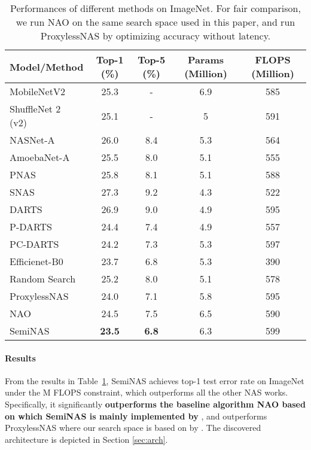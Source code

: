 \documentclass{article}
\begin{document}
\begin{table}[htbp]
\centering
\small
\begin{tabular}{lcccc}
\toprule
Model/Method                      & Top-1 (\%) & Top-5 (\%) & Params (Million) & FLOPS (Million) \\ \hline
MobileNetV2~\cite{mobilenetv2}               & 25.3      & -        & 6.9             & 585 \\
ShuffleNet 2 (v2)~\cite{shufflenet}  & 25.1      & -        &  5        & 591  \\
\midrule
NASNet-A~\cite{nas}               & 26.0      & 8.4       & 5.3       & 564 \\
AmoebaNet-A~\cite{amoebanet}      & 25.5      & 8.0       & 5.1       & 555 \\
PNAS~\cite{PNAS}                  & 25.8      & 8.1       & 5.1       & 588 \\
SNAS~\cite{snas}                  & 27.3      & 9.2       & 4.3       & 522\\
DARTS~\cite{darts}                & 26.9      & 9.0       & 4.9       & 595 \\
P-DARTS~\cite{pdarts}             & 24.4      & 7.4       & 4.9       & 557\\
PC-DARTS~\cite{pcdarts}           & 24.2      & 7.3       & 5.3       & 597\\
Efficienet-B0~\cite{efficientnet} & 23.7      & 6.8       & 5.3       & 390 \\
\midrule
Random Search                    & 25.2    & 8.0     & 5.1   & 578 \\
ProxylessNAS~\cite{proxylessnas}  & 24.0      & 7.1  & 5.8      & 595\\
NAO~\cite{nao}                  & 24.5      & 7.5       & 6.5       & 590 \\
\midrule
SemiNAS                           & \textbf{23.5}      & \textbf{6.8}       & 6.3      & 599\\
\bottomrule
\end{tabular}
\caption{Performances of different methods on ImageNet. For fair comparison, we run NAO on the same search space used in this paper, and run ProxylessNAS by optimizing accuracy without latency.}
\label{tbl:imagenet}
\end{table}
\paragraph{Results}
From the results in Table~\ref{tbl:imagenet}, SemiNAS achieves  top-1 test error rate on ImageNet under the M FLOPS constraint, which outperforms all the other NAS works. Specifically, it significantly \textbf{outperforms the baseline algorithm NAO based on which SemiNAS is mainly implemented by }, and outperforms ProxylessNAS where our search space is based on by . The discovered architecture is depicted in Section \ref{sec:arch}.
\end{document}
